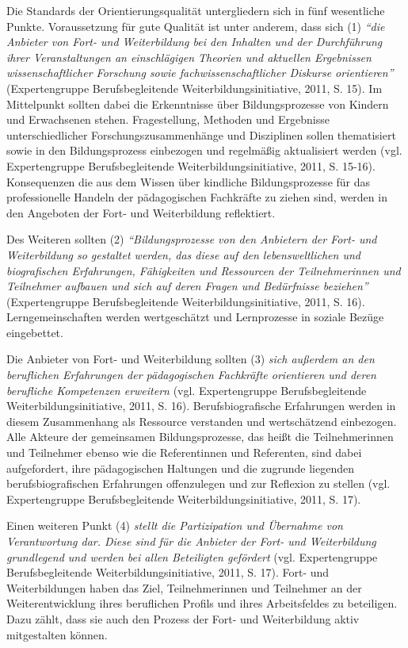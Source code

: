 \documentclass[12pt,a4paper]{article}
\begin{document}
Die Standards der Orientierungsqualität untergliedern sich in fünf wesentliche Punkte. Voraussetzung für gute Qualität ist unter anderem, dass sich (1) \textit{"`die Anbieter von Fort- und Weiterbildung bei den Inhalten und der Durchführung ihrer Veranstaltungen an einschlägigen Theorien und aktuellen Ergebnissen wissenschaftlicher Forschung sowie fachwissenschaftlicher Diskurse orientieren"'} (Expertengruppe Berufsbegleitende Weiterbildungsinitiative, 2011, S. 15). Im Mittelpunkt sollten dabei die Erkenntnisse über Bildungsprozesse von Kindern und Erwachsenen stehen. Fragestellung, Methoden und Ergebnisse unterschiedlicher Forschungszusammenhänge und Disziplinen sollen thematisiert sowie in den Bildungsprozess einbezogen und regelmäßig aktualisiert werden (vgl. Expertengruppe Berufsbegleitende Weiterbildungsinitiative, 2011, S. 15-16). Konsequenzen die aus dem Wissen über kindliche Bildungsprozesse für das professionelle Handeln der pädagogischen Fachkräfte zu ziehen sind, werden in den Angeboten der Fort- und Weiterbildung reflektiert. 

Des Weiteren sollten (2) \textit{"`Bildungsprozesse von den Anbietern der Fort- und Weiterbildung so gestaltet werden, das diese auf den lebensweltlichen und biografischen Erfahrungen, Fähigkeiten und Ressourcen der Teilnehmerinnen und Teilnehmer aufbauen und sich auf deren Fragen und Bedürfnisse beziehen"'} (Expertengruppe Berufsbegleitende Weiterbildungsinitiative, 2011, S. 16). Lerngemeinschaften werden wertgeschätzt und Lernprozesse in soziale Bezüge eingebettet. 

Die Anbieter von Fort- und Weiterbildung sollten (3) \textit{sich außerdem an den beruflichen Erfahrungen der pädagogischen Fachkräfte orientieren und deren berufliche Kompetenzen erweitern} (vgl. Expertengruppe Berufsbegleitende Weiterbildungsinitiative, 2011, S. 16). Berufsbiografische Erfahrungen werden in diesem Zusammenhang als Ressource verstanden und wert\-schät\-zend einbezogen. Alle Akteure der gemeinsamen Bildungsprozesse, das heißt die Teilnehmerinnen und Teilnehmer ebenso wie die Referentinnen und Referenten, sind dabei aufgefordert, ihre pädagogischen Haltungen und die zugrunde liegenden berufsbiografischen Erfahrungen offenzulegen und zur Reflexion zu stellen (vgl. Expertengruppe Berufsbegleitende Weiterbildungsinitiative, 2011, S. 17).

Einen weiteren Punkt (4) \textit{stellt die Partizipation und Übernahme von Verantwortung dar. Diese sind für die Anbieter der Fort- und Weiterbildung grundlegend und werden bei allen Beteiligten gefördert }(vgl. Expertengruppe Berufsbegleitende Weiterbildungsinitiative, 2011, S. 17). Fort- und Weiterbildungen haben das Ziel, Teilnehmerinnen und Teilnehmer an der Weiterentwicklung ihres beruflichen Profils und ihres Arbeitsfeldes zu beteiligen. Dazu zählt, dass sie auch den Prozess der Fort- und Weiterbildung aktiv mitgestalten können. 
\end{document}
